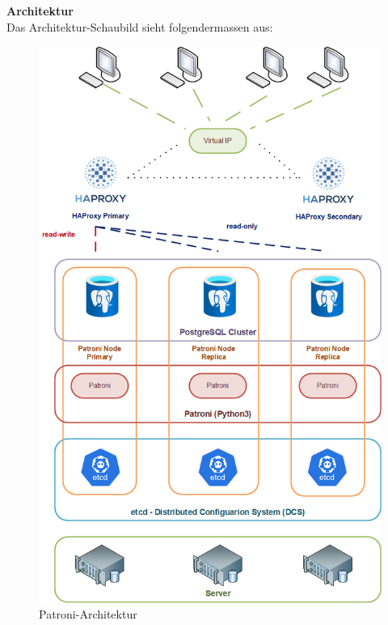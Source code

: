 \begin{flushleft}
    \textbf{Architektur}\\
    Das Architektur-Schaubild sieht folgendermassen aus:
    \begin{figure}[H]
        \centering
        \includegraphics[width=1\linewidth]{source/implementation/evaluation/postgresql_ha_solutions/patroni_architecture}
        \caption{Patroni-Architektur}
        \label{fig:patroni-architecture}
    \end{figure}
\end{flushleft}